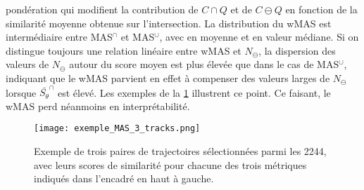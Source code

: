 \documentclass[../main.tex]{subfiles}
\begin{document}
pondération qui modifient la contribution de $C \cap Q$ et de $C \ominus Q$ en fonction de la similarité moyenne obtenue sur l'intersection. La distribution du
wMAS est intermédiaire entre MAS$^\cap$ et MAS$^\cup$, avec  en moyenne et  en valeur médiane. Si on distingue toujours une relation linéaire
entre wMAS et $N_\ominus$, la dispersion des valeurs de $N_\ominus$ autour du score moyen est plus élevée que dans le cas de MAS$^\cup$, indiquant que le wMAS
parvient en effet à compenser des valeurs larges de $N_\ominus$ lorsque $\bar{S_\theta}^\cap$ est élevé. Les exemples de la \cref{fig:exemple_MAS} illustrent ce
point. Ce faisant, le wMAS perd néanmoins en interprétabilité.

\begin{figure}[htbp]
    \centering
    \texttt{[image: exemple\_MAS\_3\_tracks.png]}
    \caption{Exemple de trois paires de trajectoires sélectionnées parmi les \num{2244}, avec leurs scores de similarité pour chacune des trois métriques
    indiqués dans l'encadré en haut à gauche.}
    \label{fig:exemple_MAS}
\end{figure}
\end{document}
